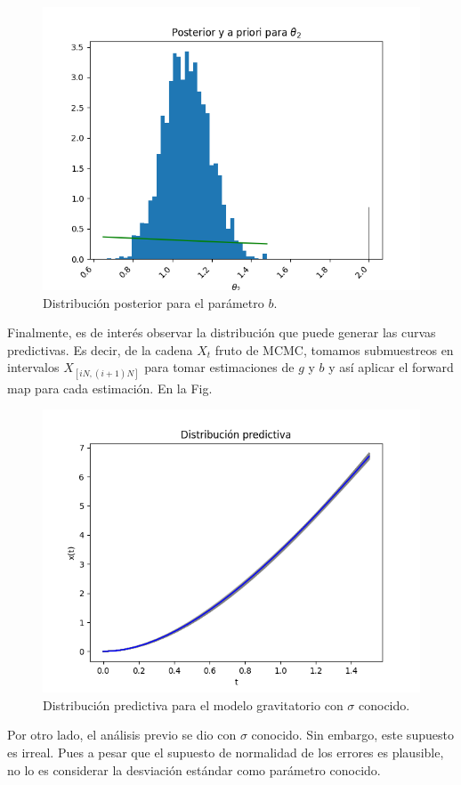 \begin{figure}[H] 
    \centering 
    \includegraphics[width = 10 cm ]{img/Exp_Central_gravedad/Figuras/Generales/Post_theta2_gravedad.png} 
    \caption{Distribución posterior para el parámetro $b$.}
    \label{Fig. 3.2.2.05}
\end{figure} 

Finalmente, es de interés observar la distribución que puede generar las curvas predictivas. Es decir, de la cadena $X_t$ fruto de MCMC, tomamos submuestreos en intervalos $X_{[iN,(i+1)N]}$ para tomar estimaciones de $g$ y $b$ y así aplicar el forward map para cada estimación. En la Fig.

\begin{figure}[H] 
    \centering 
    \includegraphics[width = 10 cm ]{img/Exp_Central_gravedad/Figuras/Generales/Predictiva_gravedad.png} 
    \caption{Distribución predictiva para el modelo gravitatorio con $\sigma$ conocido.}
    \label{Fig. 3.2.2.06}
\end{figure} 


Por otro lado, el análisis previo se dio con $\sigma$ conocido. Sin embargo, este supuesto es irreal. Pues a pesar que el supuesto de normalidad de los errores es plausible, no lo es considerar la desviación estándar como parámetro conocido. 

